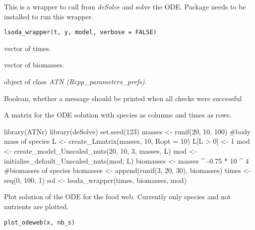 \documentclass[letterpaper]{book}
\begin{document}
%
\begin{Description}\relax
This is a wrapper to call  from
\emph{deSolve} and solve the ODE.
Package  needs to be installed to run
this wrapper.
\end{Description}
%
\begin{Usage}
\begin{verbatim}
lsoda_wrapper(t, y, model, verbose = FALSE)
\end{verbatim}
\end{Usage}
%
\begin{Arguments}
\begin{ldescription}
\item[\code{t}] vector of times.

\item[\code{y}] vector of biomasses.

\item[\code{model}] object of class \emph{ATN (Rcpp\_parameters\_prefs)}.

\item[\code{verbose}] Boolean, whether a message should be printed when all checks were successful
\end{ldescription}
\end{Arguments}
%
\begin{Value}
A matrix for the ODE solution with species as columns and
times as rows.
\end{Value}
%
\begin{Examples}
\begin{ExampleCode}
library(ATNr)
library(deSolve)
set.seed(123)
masses <- runif(20, 10, 100) #body mass of species
L <- create_Lmatrix(masses, 10, Ropt = 10)
L[L > 0] <- 1
mod <- create_model_Unscaled_nuts(20, 10, 3, masses, L)
mod <- initialise_default_Unscaled_nuts(mod, L)
biomasses <- masses ^ -0.75 * 10 ^ 4 #biomasses of species
biomasses <- append(runif(3, 20, 30), biomasses)
times <- seq(0, 100, 1)
sol <- lsoda_wrapper(times, biomasses, mod)
\end{ExampleCode}
\end{Examples}
%
\begin{Description}\relax
Plot solution of the ODE for the food web. Currently only
species and not nutrients are plotted.
\end{Description}
%
\begin{Usage}
\begin{verbatim}
plot_odeweb(x, nb_s)
\end{verbatim}
\end{Usage}
\end{document}
